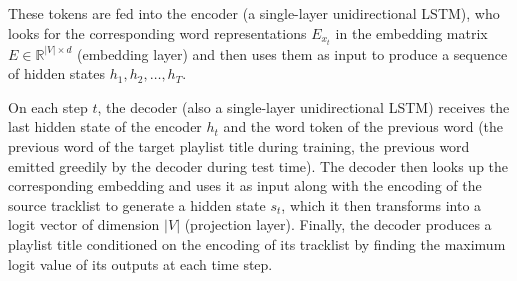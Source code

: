 \documentclass{article} %
\begin{document}
These tokens are fed into the encoder (a single-layer unidirectional LSTM), who looks for the corresponding word representations $E_{x_t}$ in the embedding matrix $E \in \mathbb{R}^{|V|\times d}$ (embedding layer) and then uses them as input to produce a sequence of hidden states $h_1, h_2, \dots, h_T$.

On each step $t$, the decoder (also a single-layer unidirectional LSTM) receives the last hidden state of the encoder $h_t$ and the word token of the previous word (the previous word of the target playlist title during training, the previous word emitted greedily by the decoder during test time).
The decoder then looks up the corresponding embedding and uses it as input along with the encoding of the source tracklist to generate a hidden state $s_t$, which it then transforms into a logit vector of dimension $|V|$ (projection layer). 
Finally, the decoder produces a playlist title conditioned on the encoding of its tracklist by finding the maximum logit value of its outputs at each time step. 
\end{document}
